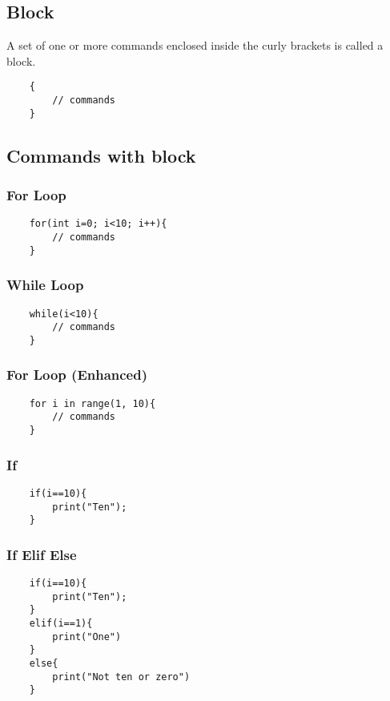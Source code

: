 \documentclass[12pt,letterpaper]{article}
\begin{document}
\subsection{Block}
A set of one or more commands enclosed inside the curly brackets is called a block.

\begin{verbatim}
    {
        // commands
    }
\end{verbatim}

\subsection{Commands with block}
\subsubsection{For Loop}
\begin{verbatim}
    for(int i=0; i<10; i++){
        // commands
    }
\end{verbatim}

\subsubsection{While Loop}
\begin{verbatim}
    while(i<10){
        // commands
    }
\end{verbatim}

\subsubsection{For Loop (Enhanced)}
\begin{verbatim}
    for i in range(1, 10){
        // commands
    }
\end{verbatim}

\subsubsection{If}
\begin{verbatim}
    if(i==10){
        print("Ten");
    }
\end{verbatim}

\subsubsection{If Elif Else}
\begin{verbatim}
    if(i==10){
        print("Ten");
    }
    elif(i==1){
        print("One")
    }
    else{
        print("Not ten or zero")
    }
\end{verbatim}
\end{document}
